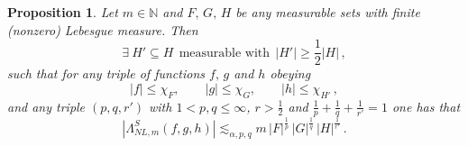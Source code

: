 \documentclass[a4paper,reqno]{amsart}
\numberwithin{equation}{section}
\newtheorem{proposition}[theorem]{Proposition}
\theoremstyle{definition}
\newcommand{\N}{\mathbb{N}}
\def\a{\alpha}
\def\L{\Lambda}
\begin{document}
\begin{proposition}\label{Lgennodecaynl}
Let $m\in\N$ and $F,\,G,\,H$ be any measurable sets with finite (nonzero) Lebesgue measure. Then
\begin{equation}\label{Hprexistnl}
\exists\:H'\subseteq H\:\:\textrm{measurable with}\:\:|H'|\geq \frac{1}{2} |H|\,,
\end{equation}
such that for any triple of functions $f,\,g$ and $h$ obeying
\begin{equation}\label{restrcitedweaknl}
|f|\leq \chi_{F},\qquad |g|\leq \chi_{G},\qquad |h|\leq \chi_{H'}\,,
\end{equation}
and any triple $(p,q,r')$ with $1<p,q\leq \infty$, $r>\frac{1}{2}$ and $\frac{1}{p}+\frac{1}{q}+\frac{1}{r'}=1$ one has that
\begin{equation}\label{goallsl1nl}
|\L^{S}_{NL,m}(f,g,h)|\lesssim_{\a,p,q} m\,|F|^{\frac{1}{p}}\,|G|^{\frac{1}{q}}\,|H|^{\frac{1}{r'}}\,.
\end{equation}
\end{proposition}
\end{document}

